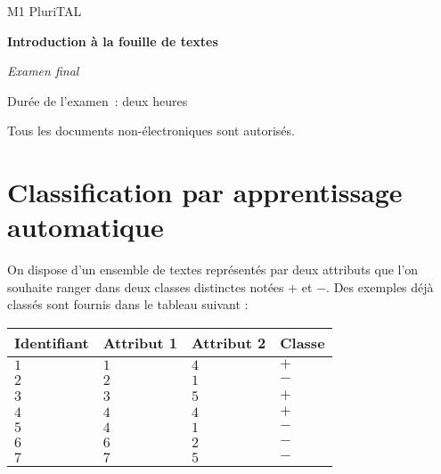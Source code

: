\documentclass[a4paper, 11pt]{article}
\title{\titlepagetitle}
\author{\myname <\mymail>}
\date{\docdate}
\begin{document}
{
   \begin{center}
      \large{M1 PluriTAL}\par
      \vspace{1em}
      \huge\textbf{Introduction à la fouille de textes}\par
      \vspace{0.5em}
      \LARGE\textit{Examen final}\par
      \vspace{0.5em}
      \Large\thedate
   \end{center}
}

Durée de l'examen : deux heures

Tous les documents non-électroniques sont autorisés.

\section{Classification par apprentissage automatique}
On dispose d'un ensemble de textes représentés par deux attributs que l'on souhaite ranger dans deux classes distinctes notées $+$ et $-$.
Des exemples déjà classés sont fournis dans le tableau suivant :

\begin{center}
\begin{tabu} to 0.6
    \toprule
    \textbf{Identifiant} & \textbf{Attribut 1} & \textbf{Attribut 2} & \textbf{Classe}\\
    \midrule
    $1$ & $1$ & $4$ & $+$\\
    $2$ & $2$ & $1$ & $-$\\
    $3$ & $3$ & $5$ & $+$\\
    $4$ & $4$ & $4$ & $+$\\
    $5$ & $4$ & $1$ & $-$\\
    $6$ & $6$ & $2$ & $-$\\
    $7$ & $7$ & $5$ & $-$\\
    \bottomrule
\end{tabu}
\end{center}
\end{document}
